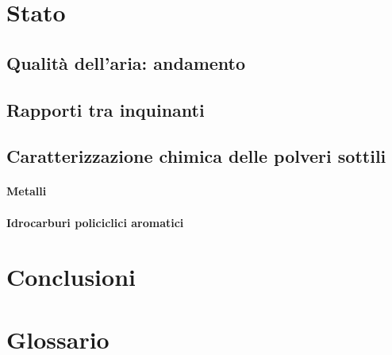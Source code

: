 \documentclass[lualatex,12pt,a4paper]{article}
\begin{document}
\FloatBarrier
\section{Stato}
\subsection{Qualità dell'aria: andamento}\label{cap:qaria}

\FloatBarrier
\subsection{Rapporti tra inquinanti}\label{cap:rapporti}

\FloatBarrier
\subsection{Caratterizzazione chimica delle polveri sottili}\label{cap:chimica}
\paragraph{Metalli}\label{cap:metalli}

\FloatBarrier
\paragraph{Idrocarburi policiclici aromatici}\label{cap:ipa}



\FloatBarrier\pagebreak
\section*{Conclusioni}


\FloatBarrier\pagebreak
\section*{Glossario}



\FloatBarrier\pagebreak


\end{document}
